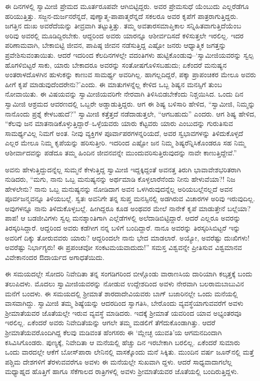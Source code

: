 ಈ ದಿನಗಳಲ್ಲಿ ಸ್ವಾಮೀಜಿ ಪ್ರೇಮದ ಮೂರ್ತರೂಪವೇ ಆಗಿಬಿಟ್ಟಿದ್ದರು. ಅವರ ಪ್ರೇಮಸುಧೆ ಯೆಂಬುದು ಎಲ್ಲರೆಡೆಗೂ ಹರಿಯುತ್ತಿತ್ತು. ಸಜ್ಜನ-ದುರ್ಜನರೆನ್ನದೆ, ಪುಣ್ಯಾತ್ಮ-ಪಾಪಾತ್ಮರೆನ್ನದೆ ಸಕಲರೂ ಅವರ ಕೃಪೆಗೆ ಪಾತ್ರರಾಗುತ್ತಿದ್ದರು. ಜಗತ್ತಿನ ದುಃಖ ಅವರೆದೆಯನ್ನು ತೀವ್ರವಾಗಿ ತಟ್ಟುತ್ತಿತ್ತು. ತಮ್ಮ ಅವತಾರಸಮಾಪ್ತಿಕಾಲ ಸನ್ನಿಹಿತವಾಗುತ್ತಿದೆಯೆಂಬ ಅರಿವು ಅವರಲ್ಲಿ ಮೂಡಿದ್ದಿರಬೇಕು. ಆದ್ದರಿಂದ ಅವರು ಯಾರನ್ನೂ ಆಶೀರ್ವದಿಸದೆ ಕಳಿಸುತ್ತಲೇ ಇರಲಿಲ್ಲ. ಇದರ ಪರಿಣಾಮವಾಗಿ, ಬೇಕಾಬಿಟ್ಟಿ ಜೀವನ, ಪಾಪಿಷ್ಠ ಜೀವನ ನಡೆಸುತ್ತಿದ್ದ ಎಷ್ಟೋ ಜನರು ಆಧ್ಯಾತ್ಮಿಕ ಜಗತ್ತನ್ನು ಪ್ರವೇಶಿಸುವಂತಾಯಿತು. ಆದರೆ ಇದರಿಂದ ಕೆಲದಿನಗಳಲ್ಲೇ ವದಂತಿಗಳು ಹುಟ್ಟಿಕೊಂಡುವು–‘ಸ್ವಾಮೀಜಿಯವರನ್ನು ಸ್ವಲ್ಪ ಹೊಗಳಿಬಿಟ್ಟರೆ ಸಾಕು, ಯಾರು ಬೇಕಾದರೂ ಅವರನ್ನು ಸಂತೋಷಗೊಳಿಸಬಹುದು; ಏಕೆಂದರೆ ಮನುಷ್ಯನ ಅಂತರಾಳದೊಳಗಿನ ಹುಳುಕನ್ನು ಕಾಣುವ ಸಾಮರ್ಥ್ಯ ಅವರಿಗಿಲ್ಲ. ಹಾಗಲ್ಲದಿದ್ದರೆ, ಪಕ್ಕಾ ಪ್ರಾಪಂಚಿಕರ ಮೇಲೂ ಅವರು ಹೀಗೆ ಕೃಪೆ ಮಾಡುವುದೆಂದರೇನು?’ಎಂದು. ಈ ಮಾತುಗಳನ್ನೆಲ್ಲ ಕೇಳಿದ ಒಬ್ಬ ಶಿಷ್ಯನ ಮನಸ್ಸಿಗೆ ತುಂಬ ನೋವಾಯಿತು. ಈ ವಿಷಯವನ್ನು ಸ್ವಾಮೀಜಿಯವರಿಗೇ ನೇರವಾಗಿ ತಿಳಿಸಿಬಿಡಬೇಕೆಂದು ನಿಶ್ಚಯಿಸಿದ. ಒಂದು ದಿನ ಸ್ವಾಮೀಜಿ ಆಶ್ರಮದ ಆವರಣದಲ್ಲಿ ಒಬ್ಬರೇ ಅಡ್ಡಾಡುತ್ತಿದ್ದರು. ಆಗ ಈ ಶಿಷ್ಯ ಬಳಿಸಾರಿ ಹೇಳಿದ, “ಸ್ವಾಮೀಜಿ, ನಿಮ್ಮನ್ನು ನಾನೊಂದು ಪ್ರಶ್ನೆ ಕೇಳಬಹುದೆ?” ಸ್ವಾಮೀಜಿ ಕತ್ತೆತ್ತದೆ ನಡೆದಾಡುತ್ತಲೇ, “ಆಗಬಹುದು” ಎಂದರು. ಆಗ ಶಿಷ್ಯ ಹೇಳಿದ, “ಕೆಲವು ಜನ ಮಾತನಾಡಿಕೊಳ್ಳುತ್ತಿದ್ದಾರೆ–ಒಳ್ಳೆಯವರು ಯಾರು ಕೆಟ್ಟವರು ಯಾರು ಎಂಬುದನ್ನು ಗುರುತಿಸುವ ಸಾಮರ್ಥ್ಯವಿಲ್ಲ ನಿಮಗೆ ಅಂತ. ನೀವು ವ್ಯಕ್ತಿಗಳ ಪೂರ್ವಾಪರಗಳನ್ನರಿಯದೆ, ಅವರ ಸ್ವಭಾವಗಳನ್ನು ತಿಳಿದುಕೊಳ್ಳದೆ ಎಲ್ಲರ ಮೇಲೂ ನಿಮ್ಮ ಕೃಪೆಯನ್ನು ಹರಿಸುತ್ತೀರಿ. ಇದರಿಂದ ಎಷ್ಟೋ ಜನ ನಿಮ್ಮ ಶಿಷ್ಯರೆನ್ನಿಸಿಕೊಂಡರೂ ಸಹ ನಿಮ್ಮ ಆಶೀರ್ವಾದವನ್ನು ಪಡೆದೂ ತಮ್ಮ ಹಿಂದಿನ ಜೀವನವನ್ನೇ ಮುಂದುವರಿಸುತ್ತಿರುವುದನ್ನು ನಾವೇ ಕಾಣುತ್ತಿದ್ದೇವೆ.”

ಅವನು ಹೇಳುತ್ತಿದ್ದುದನ್ನೆಲ್ಲ ಸುಮ್ಮನೆ ಕೇಳುತ್ತಿದ್ದ ಸ್ವಾಮೀಜಿ ಇದ್ದಕ್ಕಿದ್ದಂತೆ ಅವನತ್ತ ತಿರುಗಿ ಭಾವಾವೇಶಭರಿತರಾಗಿ ನುಡಿದರು, “ಮಗು, ನಾನು ಒಬ್ಬ ಮನುಷ್ಯನನ್ನು ಅರ್ಥಮಾಡಿ ಕೊಳ್ಳಲಾರೆನೆಂದು ನೀನು ಹೇಳುವೆಯಾ?! ನಿಜ ಹೇಳಲೇನು? ನಾನು ಒಬ್ಬ ಮನುಷ್ಯನನ್ನು ನೋಡಿದಾಗ ಅವನ ಒಳಗಿರುವುದನ್ನೆಲ್ಲ ಅರಿಯಬಲ್ಲೆನಲ್ಲದೆ ಅವನ ಪೂರ್ವಜನ್ಮವನ್ನೂ ತಿಳಿಯಬಲ್ಲೆ. ಸ್ವತಃ ಅವನಿಗೇ ತನ್ನ ಸುಪ್ತ ಮನಸ್ಸಿನಲ್ಲಿ ಅಡಗಿರುವ ವಿಚಾರಗಳ ಅರಿವು ಇರುವುದಿಲ್ಲ. ಅವುಗಳನ್ನೂ ನಾನು ತಿಳಿದುಕೊಳ್ಳಬಲ್ಲೆ. ಹೀಗಿದ್ದರೂ ಕೂಡ ಅಂಥವರ ಮೇಲೆ ನಾನೇಕೆ ಕೃಪೆ ಮಾಡುತ್ತೇನೆ ಬಲ್ಲೆಯಾ? ಪಾಪ! ಆ ಬಡಜೀವಿಗಳು ಸ್ವಲ್ಪ ಮನಶ್ಶಾಂತಿಗಾಗಿ ಎಲ್ಲೆಡೆಗಳಲ್ಲಿ ಅಲೆದಾಡಿಬಿಟ್ಟಿದ್ದಾರೆ. ಆದರೆ ಎಲ್ಲರೂ ಅವರನ್ನು ತಿರಸ್ಕರಿಸಿದ್ದಾರೆ. ಆದ್ದರಿಂದ ಅವರು ಕಡೆಗೀಗ ನನ್ನ ಬಳಿಗೆ ಬಂದಿದ್ದಾರೆ. ನಾನೂ ಅವರನ್ನು ತಿರಸ್ಕರಿಸಿಬಿಟ್ಟರೆ ಇನ್ನು ಅವರಿಗೆ ದಿಕ್ಕು ತೋರುವವರು ಯಾರು? ಆದ್ದರಿಂದಲೇ ನಾನು ಭೇದ ಮಾಡಲಾರೆ. ಅಯ್ಯೋ, ಅವರೆಷ್ಟು ದುಃಖಿಗಳು! ಅವರೆಷ್ಟು ನಿರ್ಭಾಗ್ಯರು! ಈ ಪ್ರಪಂಚವೋ ಸಂಕಟಮಯವಾದುದು!” ಸಮಸ್ತ ವಿಶ್ವವನ್ನೇ ಪ್ರೀತಿಸುವ ವಿಶ್ವಮಾನವ ವಿವೇಕಾನಂದರ ಔದಾರ್ಯದ ಅಗಾಧತೆಯಿದು.

ಈ ಸಮಯದಲ್ಲೇ ಸೋದರಿ ನಿವೇದಿತಾ ತನ್ನ ಸಂಗಡಿಗರಿಂದ ಬೀಳ್ಗೊಂಡು ವಾರಾಣಸಿಯ ದಾರಿಯಾಗಿ ಕಲ್ಕತ್ತಕ್ಕೆ ಬಂದು ತಲುಪಿದಳು. ಮೊದಲು ಸ್ವಾಮೀಜಿಯವರನ್ನು ನೋಡುವ ಉದ್ದೇಶದಿಂದ ಅವಳು ನೇರವಾಗಿ ಬಲರಾಮಬಾಬುವಿನ ಮನೆಗೆ ಬಂದಳು. ಈ ಸಮಯದಲ್ಲಿ ಶ್ರೀಮಾತೆ ಶಾರದಾದೇವಿಯವರು ಬಾಗ್ ಬಜಾರಿನಲ್ಲೇ ಒಂದು ಮನೆಯಲ್ಲಿ ವಾಸವಾಗಿದ್ದು. ಸ್ವಾಮೀಜಿ ತಮ್ಮ ಶಿಷ್ಯೆಯನ್ನು ಆದರದಿಂದ ಸ್ವಾಗತಿಸಿ, ಬೇರೊಂದು ವ್ಯವಸ್ಥೆಯಾಗುವವರೆಗೆ ಅವಳು ಶ್ರೀಮಾತೆಯವರ ಜೊತೆಯಲ್ಲೇ ಇರುವ ವ್ಯವಸ್ಥೆ ಮಾಡಿದರು. ಇದಕ್ಕೆ ಶ್ರೀಮಾತೆ ಯವರಿಂದ ಯಾವ ಅಭ್ಯಂತರವೂ ಇರಲಿಲ್ಲ. ಏಕೆಂದರೆ ಅವರು ನಿವೇದಿತೆಯನ್ನು ಆಗಲೇ ತಮ್ಮ ಮಡಲಿಗೆ ತೆಗೆದುಕೊಂಡಾಗಿತ್ತು. ಆದರೆ ಶ್ರೀಮಾತೆಯವರೊಂದಿಗಿದ್ದ ಕೆಲವು ಮಡಿವಂತ ಹೆಂಗಸರು ಈ ‘ಮ್ಲೇಚ್ಛ ಯುವತಿ’ಯ ಆಗಮನದಿಂದಾಗಿ ಕಸಿವಿಸಿಗೊಂಡರು. ಪುಣ್ಯಕ್ಕೆ, ನಿವೇದಿತಾ ಆ ಮನೆಯಲ್ಲಿ ಹೆಚ್ಚು ದಿನ ಇರಬೇಕಾಗಿ ಬರಲಿಲ್ಲ. ಏಕೆಂದರೆ ಸುಮಾರು ಒಂದು ವಾರದಲ್ಲೇ ಆಕೆಗೆ ಬೋಸ್​ಪಾರಾ ಲೇನಿನಲ್ಲಿ ವಾಸಕ್ಕೊಂದು ಮನೆ ಸಿಕ್ಕಿತು. ಮುಂದಿನ ವರ್ಷ ಜೂನ್​ನಲ್ಲಿ ಮತ್ತೆ ಪಶ್ಚಿಮ ದೇಶಗಳಿಗೆ ತೆರಳುವವರೆಗೂ ಅವಳು ಈ ಮನೆಯಲ್ಲೇ ಸುಖವಾಗಿ ದ್ದಳು. ಆದರೆ ಸಾಧ್ಯವಾದಾಗಲೆಲ್ಲ ಮಧ್ಯಾಹ್ನದ ಹೊತ್ತಿಗೆ ಹಾಗೂ ಸೆಕೆಗಾಲದ ರಾತ್ರಿಗಳಲ್ಲಿ ಅವಳು ಶ್ರೀಮಾತೆಯವರ ಜೊತೆಯಲ್ಲಿ ಬಂದಿರುತ್ತಿದ್ದಳು.

